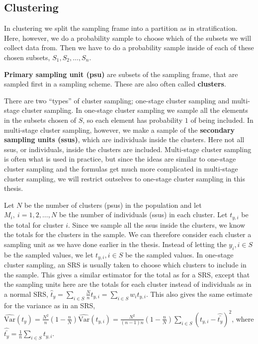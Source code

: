 \documentclass{article}
\begin{document}
\subsection{Clustering} \label{sec:clustering}


In clustering we split the sampling frame into a partition as in stratification.
Here, however, we do a probability sample to choose which of the subsets we will
collect data from. Then we have to do a probability sample
inside of each of these chosen subsets, \(S_1, S_2, \dots, S_n\).

\begin{definition}
 \textbf{Primary sampling unit (psu)} are subsets of the sampling frame, that
 are sampled first in a sampling scheme. These are also often called \textbf{clusters}. 
\end{definition}

There are two ``types'' of cluster sampling; one-stage cluster sampling and
multi-stage cluster sampling. In one-stage cluster sampling we sample all the
elements in the subsets chosen of \(S\), so each element has probability \(1\)
of being included. In multi-stage cluster sampling, however,
we make a sample of the \textbf{secondary sampling units (ssus)}, which are
individuals inside the clusters. Here not all ssus, or
individuals, inside the clusters are included. Multi-stage cluster sampling is often what is used in
practice, but since the ideas are similar to one-stage cluster sampling and
the formulas get much more complicated in multi-stage cluster sampling,
we will restrict outselves to one-stage cluster sampling in this thesis.

Let \(N\) be the number of clusters (psus) in the population and let \(M_i,\ i =
1, 2, \dots, N\) be the number of individuals (ssus) in each cluster. Let
\(t_{y, i}\) be the total for cluster \(i\). Since we sample all the ssus inside
the clusters, we know the totals for the
clusters in the sample. We can therefore consider each cluster a sampling unit as we
have done earlier in the thesis. Instead of letting the \(y_i, i \in S\) be the
sampled values, we let \(t_{y, i}, i \in S\) be the sampled values. In one-stage cluster sampling, an SRS is
usually taken to choose which clusters to include in the sample. This gives a
similar estimator for the total as for a SRS, except that the sampling units here
are the totals for each cluster instead of individuals as in a normal SRS,
\(\hat{t}_y = \sum_{i \in S} \frac{N}{n} t_{y, i} = \sum_{i \in S} w_i t_{y, i} \). 
This also gives the same estimate for the variance as in an SRS,
\(\widehat{\mathrm{Var}}\left(t_{y}\right) = \frac{N^2}{n} \left( 1 - \frac{n}{N}
\right) \hat{\mathrm{Var}}\left( t_{y, i} \right) =
\frac{N^2}{\left( n - 1 \right)n} \left( 1 - \frac{n}{N} \right) \sum_{i \in S}
\left( t_{y, i} - \hat{\bar{t_y}} \right)^2\), where \(\hat{\bar{t_y}} =
\frac{1}{n} \sum_{i \in S} t_{y, i}\).
\end{document}
